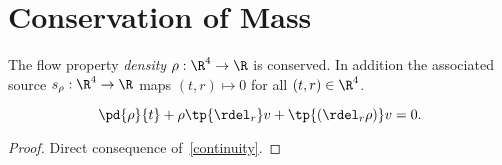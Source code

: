 \section{Conservation of Mass}
\begin{df}[Density]
    The flow property \emph{density} $\rho:\R^4\to \R$ is conserved.
    In addition the associated source $s_\rho: \R^4 \to \R$ maps
    $(t,r)\mapsto 0$ for all $(t,r)\in \R^4$.
\end{df}
\begin{thm}
    \begin{equation}
    \label{conmass}
    \pd{\rho}{t} + \rho \tp{\rdel_r} v  +  \tp{(\rdel_r\rho )} v = 0.
    \end{equation}
\end{thm}
\begin{proof}
    Direct consequence of~\autoref{continuity}.
\end{proof}
